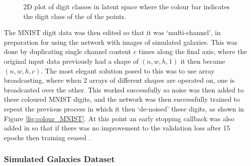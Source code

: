 \documentclass[fleqn,usenatbib]{mnras}
\begin{document}
\begin{figure}
    \caption{2D plot of digit classes in latent space where the colour bar indicates the digit class of the of the points.}
    \label{fig:if/else plots}
\end{figure}

The MNIST digit data was then edited so that it was ‘multi-channel', in preparation for using the network with images of simulated galaxies. This was done by duplicating single channel content $c$ times along the final axis, where the original input data previously had a shape of $(n, w, h, 1)$ it then became $(n, w, h, c)$. The most elegant solution posed to this was to use array broadcasting, where when 2 arrays of different shapes are operated on, one is broadcasted over the other. This worked successfully so noise was then added to these coloured MNIST digits, and the network was then successfully trained to repeat the previous process in which it then ‘de-noised’ these digits, as shown in Figure \ref{fig:colour_MNIST}. At this point an early stopping callback was also added in so that if there was no improvement to the validation loss after 15 epochs then training ceased \citep{Raskutti2013}.

\subsubsection{Simulated Galaxies Dataset}
\label{sec: network_gal}
\end{document}
